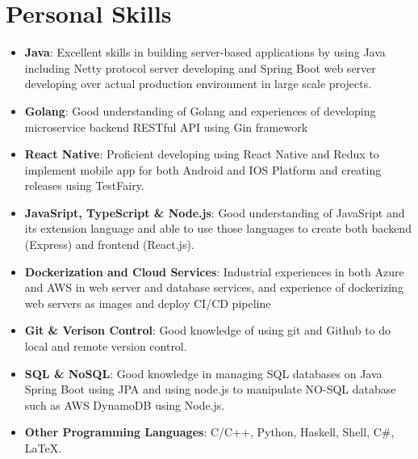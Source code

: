 \documentclass[letterpaper,11pt]{article}
\newcommand{\resumeItem}[2]{
  \item\small{
    \textbf{#1}{: #2 \vspace{-2pt}}
  }
}
\newcommand{\resumeItemListStart}{\begin{itemize}}
\newcommand{\resumeItemListEnd}{\end{itemize}\vspace{-5pt}}
\begin{document}
\section{Personal Skills}
    \resumeItemListStart
        \resumeItem{Java}{Excellent skills in building server-based applications by using Java including Netty protocol 
        server developing and Spring Boot web server developing over actual production environment in large scale projects.}
        \resumeItem{Golang}{Good understanding of Golang and experiences of developing microservice backend RESTful API using Gin framework}
        \resumeItem{React Native}{Proficient developing using React Native and Redux to implement mobile app for both Android and IOS Platform
        and creating releases using TestFairy.}
        \resumeItem{JavaSript, TypeScript \& Node.js}{Good understanding of JavaSript and its extension language and able to use those languages to create both backend (Express) and frontend (React.js). }
        \resumeItem{Dockerization and Cloud Services}{Industrial experiences in both Azure and AWS in web server and database services, and experience of dockerizing web servers as images and deploy CI/CD pipeline}
        \resumeItem{Git \& Verison Control}{Good knowledge of using git and Github to do local and remote version control.}
        \resumeItem{SQL \& NoSQL}{Good knowledge in managing SQL databases on Java Spring Boot using JPA and using node.js to manipulate NO-SQL database such as AWS DynamoDB using Node.js.}
        \resumeItem{Other Programming Languages}{C/C++, Python, Haskell, Shell, C\#, \LaTeX.}
    \resumeItemListEnd

\end{document}
